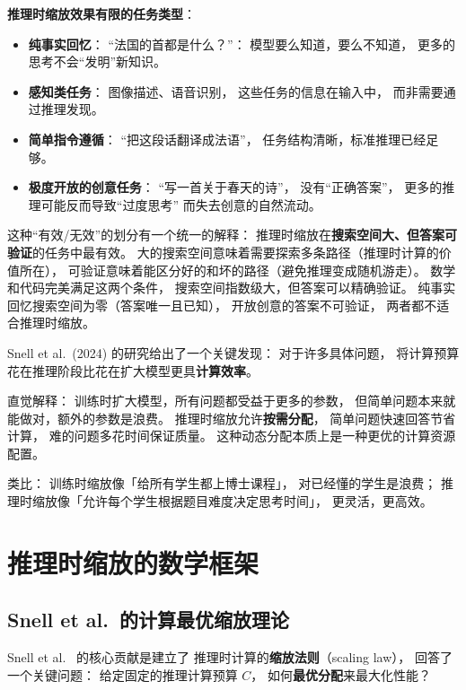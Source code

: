 \textbf{推理时缩放效果有限的任务类型}：
\begin{itemize}[noitemsep]
  \item \textbf{纯事实回忆}：
        “法国的首都是什么？”：
        模型要么知道，要么不知道，
        更多的思考不会“发明”新知识。
  \item \textbf{感知类任务}：
        图像描述、语音识别，
        这些任务的信息在输入中，
        而非需要通过推理发现。
  \item \textbf{简单指令遵循}：
        “把这段话翻译成法语”，
        任务结构清晰，标准推理已经足够。
  \item \textbf{极度开放的创意任务}：
        “写一首关于春天的诗”，
        没有“正确答案”，
        更多的推理可能反而导致“过度思考”
        而失去创意的自然流动。
\end{itemize}

这种“有效/无效”的划分有一个统一的解释：
推理时缩放在\textbf{搜索空间大、但答案可验证}的任务中最有效。
大的搜索空间意味着需要探索多条路径（推理时计算的价值所在），
可验证意味着能区分好的和坏的路径（避免推理变成随机游走）。
数学和代码完美满足这两个条件，
搜索空间指数级大，但答案可以精确验证。
纯事实回忆搜索空间为零（答案唯一且已知），
开放创意的答案不可验证，
两者都不适合推理时缩放。

\begin{whybox}[为什么推理时缩放可能比训练时缩放更高效？]
Snell et al.\ (2024) 的研究给出了一个关键发现：
对于许多具体问题，
将计算预算花在推理阶段比花在扩大模型更具\textbf{计算效率}。

直觉解释：
训练时扩大模型，所有问题都受益于更多的参数，
但简单问题本来就能做对，额外的参数是浪费。
推理时缩放允许\textbf{按需分配}，
简单问题快速回答节省计算，
难的问题多花时间保证质量。
这种动态分配本质上是一种更优的计算资源配置。

类比：
训练时缩放像「给所有学生都上博士课程」，
对已经懂的学生是浪费；
推理时缩放像「允许每个学生根据题目难度决定思考时间」，
更灵活，更高效。
\end{whybox}


\section{推理时缩放的数学框架}

\subsection{Snell et al.\ 的计算最优缩放理论}

Snell et al.~\cite{snell2024scaling} 的核心贡献是建立了
推理时计算的\textbf{缩放法则}（scaling law），
回答了一个关键问题：
给定固定的推理计算预算 $C$，
如何\textbf{最优分配}来最大化性能？

